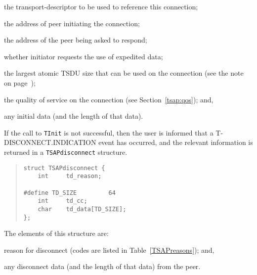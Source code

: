\begin{describe}\label{TSAPstart}
\item[\verb"ts\_sd":] the transport-descriptor to be used to reference this
connection;

\item[\verb"ts\_calling":] the address of peer initiating the connection;

\item[\verb"ts\_called":] the address of the peer being asked to respond;

\item[\verb"ts\_expedited":]	whether initiator requests the use of expedited
	data;

\item[\verb"ts\_tsdusize":]	the largest atomic TSDU size that can be used
on the connection (see the note on page~\pageref{TSDU:atomic});

\item[\verb"ts\_qos":] the quality of service on the connection
(see Section~\ref{tsap:qos});
and,

\item[\verb"ts\_data"/\verb"ts\_cc":] any initial data
(and the length of that data).
\end{describe}

If the call to \verb"TInit" is not successful,
then the user is informed that a {\sf T-DISCONNECT.INDICATION\/} event has
occurred,
and the relevant information is returned in a \verb"TSAPdisconnect" structure.
\begin{quote}\small\begin{verbatim}
struct TSAPdisconnect {
    int     td_reason;

#define TD_SIZE         64
    int     td_cc;
    char    td_data[TD_SIZE];
};
\end{verbatim}\end{quote}
The elements of this structure are:\label{TSAPdisconnect}
\begin{describe}
\item[\verb"td\_reason":] reason for disconnect
(codes are listed in Table~\ref{TSAPreasons});
and,

\item[\verb"td\_data"/\verb"td\_cc":] any disconnect data
(and the length of that data) from the peer.
\end{describe}

